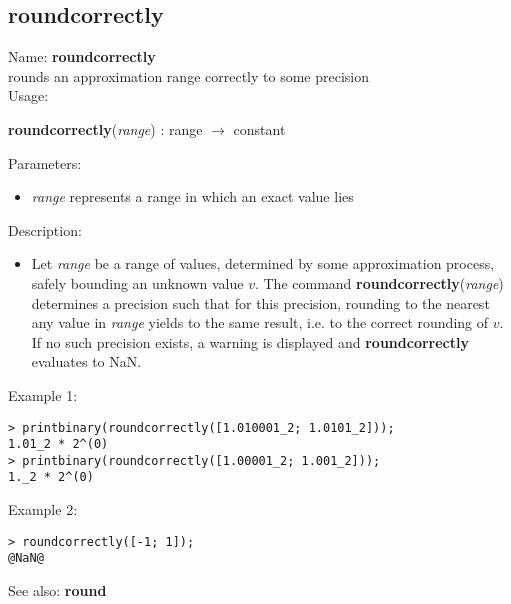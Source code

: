 \subsection{ roundcorrectly }
\noindent Name: \textbf{roundcorrectly}\\
rounds an approximation range correctly to some precision\\

\noindent Usage: 
\begin{center}
\textbf{roundcorrectly}(\emph{range}) : \textsf{range} $\rightarrow$ \textsf{constant}\\
\end{center}
Parameters: 
\begin{itemize}
\item \emph{range} represents a range in which an exact value lies
\end{itemize}
\noindent Description: \begin{itemize}

\item Let \emph{range} be a range of values, determined by some approximation
   process, safely bounding an unknown value $v$. The command
   \textbf{roundcorrectly}(\emph{range}) determines a precision such that for this precision,
   rounding to the nearest any value in \emph{range} yields to the same
   result, i.e. to the correct rounding of $v$.
   If no such precision exists, a warning is displayed and \textbf{roundcorrectly}
   evaluates to NaN.
\end{itemize}
\noindent Example 1: 
\begin{center}\begin{minipage}{15cm}\begin{Verbatim}[frame=single]
> printbinary(roundcorrectly([1.010001_2; 1.0101_2]));
1.01_2 * 2^(0)
> printbinary(roundcorrectly([1.00001_2; 1.001_2]));
1._2 * 2^(0)
\end{Verbatim}
\end{minipage}\end{center}
\noindent Example 2: 
\begin{center}\begin{minipage}{15cm}\begin{Verbatim}[frame=single]
> roundcorrectly([-1; 1]);
@NaN@
\end{Verbatim}
\end{minipage}\end{center}
See also: \textbf{round}
